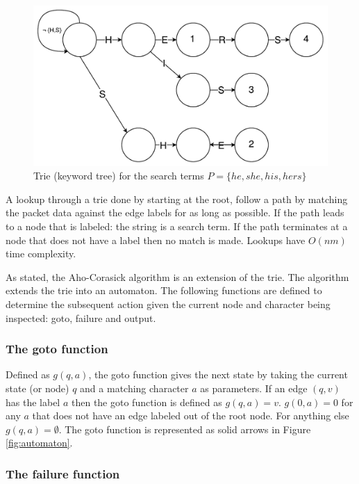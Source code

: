 \documentclass{article}
\begin{document}
\begin{figure}[h!bt]
  \label{fig:trie}
  \centering
  \makeatletter
  \includegraphics[width=\textwidth]{images/trie.pdf}
  \caption{Trie (keyword tree) for the search terms \(P = \{he, she, his, hers\}\)}
\end{figure}

A lookup through a trie done by starting at the root, follow a path by matching the packet data against the edge labels for as long as possible. If the path leads to a node that is labeled: the string is a search term. If the path terminates at a node that does not have a label then no match is made. Lookups have \(O(nm)\) time complexity.

As stated, the Aho-Corasick algorithm is an extension of the trie. The algorithm extends the trie into an automaton. The following functions are defined to determine the subsequent action given the current node and character being inspected: goto, failure and output.

\subsubsection{The goto function} \label{goto-function}

Defined as \(g(q, a)\), the goto function gives the next state by taking the current state (or node) \(q\) and a matching character \(a\) as parameters. If an edge \((q, v)\) has the label \(a\) then the goto function is defined as \(g(q, a) = v\). \(g(0, a) = 0\) for any \(a\) that does not have an edge labeled out of the root node. For anything else \(g(q, a) =  \emptyset\). The goto function is represented as solid arrows in Figure \ref{fig:automaton}.

\subsubsection{The failure function} \label{failure-function}
\end{document}
